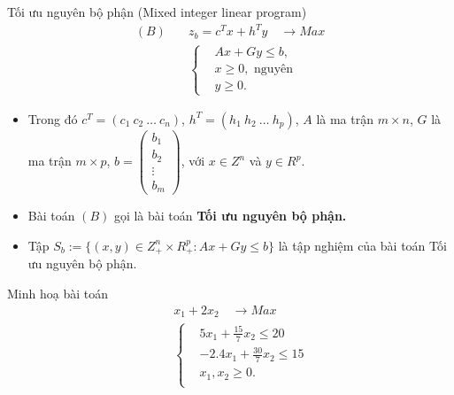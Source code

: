 \documentclass{beamer}
\begin{document}
\begin{frame}{Tối ưu nguyên bộ phận (Mixed integer linear program)}
\begin{equation}\label{B}
\begin{split}
(B) \quad & z_b=c^Tx+h^Ty \quad \longrightarrow Max \\
          & \left\{\begin{split}
            &Ax+Gy \leq  b, \\
            &x \geq 0, \text{ nguyên} \\
            &y \geq 0.
            \end{split}\right.    
\end{split}
\end{equation}    
\begin{itemize} \small
\item Trong đó $c^T=(c_1 \: c_2 \: \ldots \: c_n)$, $h^T=(h_1 \: h_2 \: \ldots \: h_p)$, $A$ là ma trận $m\times n$, $G$ là ma trận $m\times p$, $b=\begin{pmatrix}
    b_1 \\
    b_2 \\
    \vdots \\
    b_m
    \end{pmatrix}$, với $x\in Z^n$ và $y\in R^p$.
\item Bài toán $(B)$ gọi là bài toán \textbf{Tối ưu nguyên bộ phận.}
\item Tập $S_b:=\{(x,y)\in Z^n_+\times R^p_+: Ax+Gy\leq b\}$ là tập nghiệm của bài toán Tối ưu nguyên bộ phận.
\end{itemize}
\end{frame}
\begin{frame}{Minh hoạ bài toán}
   \begin{equation}
        \begin{split}
        \quad & x_1 + 2x_2 \quad \longrightarrow Max \\
                    & \left\{\begin{split}
                    & 5x_1 + \frac{15}{7}x_2 \leq 20 \\
                    & -2.4x_1 + \frac{30}{7}x_2 \leq 15 \\
                    &x_1, x_2 \geq 0. \\
                    \end{split}\right.    
        \end{split}
        \end{equation}            
\end{frame}
\end{document}
